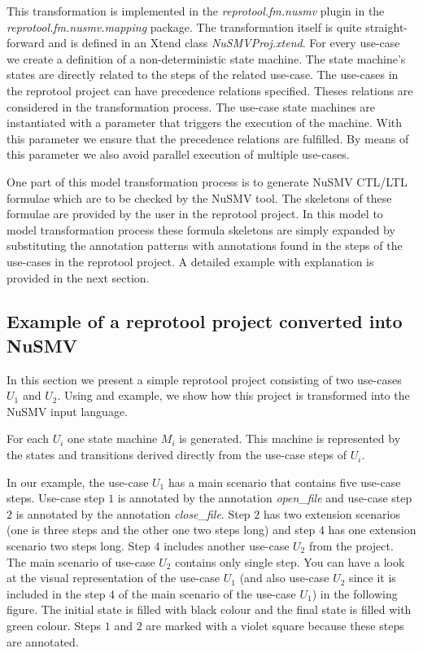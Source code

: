 This transformation is implemented in the \emph{reprotool.fm.nusmv} plugin in the \emph{reprotool.fm.nusmv.mapping} package.
The transformation itself is quite straight-forward and is defined in an Xtend class \emph{NuSMVProj.xtend}.
For every use-case we create a definition of a non-deterministic state machine.
The state machine's states are directly related to the steps of the related use-case.
The use-cases in the reprotool project can have precedence relations specified. Theses relations are considered in the
transformation process. The use-case state machines are instantiated with a parameter that triggers the execution of the machine.
With this parameter we ensure that the precedence relations are fulfilled. By means of this parameter we also avoid parallel execution
of multiple use-cases.

One part of this model transformation process is to generate NuSMV \ac{CTL}/\ac{LTL} formulae which are to be checked by the NuSMV tool.
The skeletons of these formulae are provided by the user in the reprotool project.
In this model to model transformation process these formula skeletons are simply expanded by substituting the annotation patterns with annotations found in the steps of the use-cases
in the reprotool project. A detailed example with explanation is provided in the next section.

\subsection{Example of a reprotool project converted into NuSMV}

In this section we present a simple reprotool project consisting of two use-cases $U_1$ and $U_2$. Using and example, we show how this project is transformed into the NuSMV input language.

For each $U_i$ one state machine $M_i$ is generated.
This machine is represented by the states and transitions derived directly from the use-case steps of $U_i$.

In our example, the use-case $U_1$ has a main scenario that contains five use-case steps.
Use-case step $1$ is annotated by the annotation \emph{open\_file} and use-case step $2$ is annotated by the annotation \emph{close\_file}.
Step $2$ has two extension scenarios (one is three steps and the other one two steps long) and step $4$ has one extension scenario two steps long.
Step $4$ includes another use-case $U_2$ from the project.
The main scenario of use-case $U_2$ contains only single step.
You can have a look at the visual representation of the use-case $U_1$ (and also use-case $U_2$ since it is included in the step $4$ of the main scenario of the use-case $U_1$) in the following figure.
The initial state is filled with black colour and the final state is filled with green colour. Steps $1$ and $2$ are marked with a violet square because these steps are annotated.

